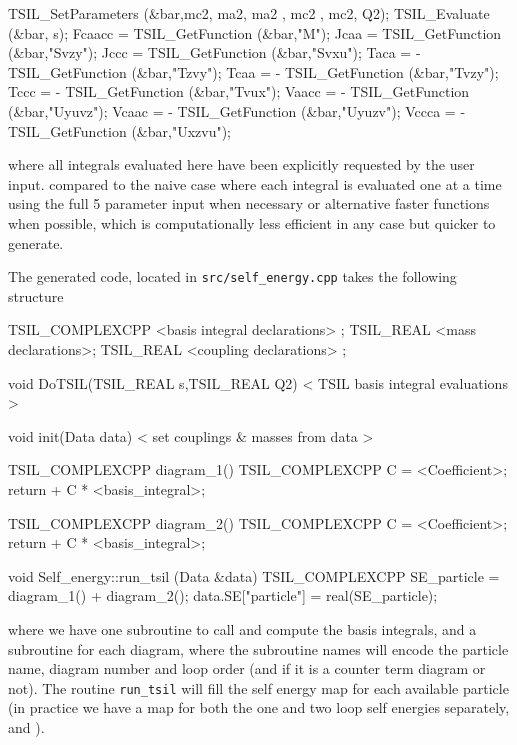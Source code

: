 \begin{lstcpp}
TSIL_SetParameters (&bar,mc2, ma2, ma2 , mc2 , mc2, Q2);
TSIL_Evaluate (&bar, s);
Fcaacc =   TSIL_GetFunction (&bar,"M");
Jcaa   =   TSIL_GetFunction (&bar,"Svzy");
Jccc   =   TSIL_GetFunction (&bar,"Svxu");
Taca   = - TSIL_GetFunction (&bar,"Tzvy");
Tcaa   = - TSIL_GetFunction (&bar,"Tvzy");
Tccc   = - TSIL_GetFunction (&bar,"Tvux");
Vaacc  = - TSIL_GetFunction (&bar,"Uyuvz");
Vcaac  = - TSIL_GetFunction (&bar,"Uyuzv");
Vccca  = - TSIL_GetFunction (&bar,"Uxzvu");
\end{lstcpp}
where all integrals evaluated here have been explicitly requested by the user input.
compared to the naive case where each integral is evaluated one at a time using the full 5 parameter input when necessary or alternative faster functions when possible, which is computationally less efficient in any case but quicker to generate.

The generated code, located in \lstinline{src/self_energy.cpp} takes the following structure
\begin{lstcpp}
TSIL_COMPLEXCPP  <basis integral declarations> ;
TSIL_REAL  <mass declarations>;
TSIL_REAL  <coupling declarations> ;

void DoTSIL(TSIL_REAL s,TSIL_REAL Q2)
{
	< TSIL basis integral evaluations >
}

void init(Data data) 
{
	< set couplings & masses from data >
}

TSIL_COMPLEXCPP  diagram_1()
{
	TSIL_COMPLEXCPP C =  <Coefficient>;
	return  + C * <basis_integral>;
}

TSIL_COMPLEXCPP  diagram_2()
{
	TSIL_COMPLEXCPP C =  <Coefficient>;
	return  + C * <basis_integral>;
}

void Self_energy::run_tsil (Data &data) 
{
	TSIL_COMPLEXCPP SE_particle = diagram_1() + diagram_2();
	data.SE["particle"] = real(SE_particle);
}
\end{lstcpp}

where we have one subroutine to call \tsil and compute the basis integrals, and a subroutine for each diagram, where the subroutine names will encode the particle name, diagram number and loop order (and if it is a counter term diagram or not).  The routine \lstinline{run_tsil} will fill the self energy map for each available particle (in practice we have a map for both the one and two loop self energies separately,  and ).

